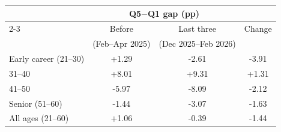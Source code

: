 \begin{tabular}{lccc}
\toprule
 & \multicolumn{2}{c}{Q5$-$Q1 gap (pp)} & \\
\cmidrule(lr){2-3}
 & Before & Last three & Change \\
 & (Feb--Apr 2025) & (Dec 2025--Feb 2026) & \\
\midrule
Early career (21--30) & +1.29 & -2.61 & -3.91 \\
31--40 & +8.01 & +9.31 & +1.31 \\
41--50 & -5.97 & -8.09 & -2.12 \\
Senior (51--60) & -1.44 & -3.07 & -1.63 \\
\addlinespace
All ages (21--60) & +1.06 & -0.39 & -1.44 \\
\bottomrule
\end{tabular}
